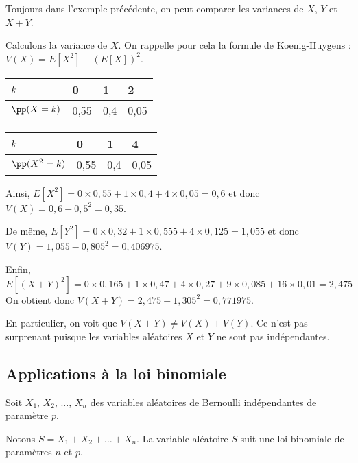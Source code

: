 \documentclass[11pt,fleqn, openany]{book} %
\begin{document}
\begin{example}Toujours dans l'exemple précédente, on peut comparer les variances de $X$, $Y$ et $X+Y$. 

Calculons la variance de $X$. On rappelle pour cela la formule de Koenig-Huygens : $V(X)=E[X^2]-(E[X])^2$.

\renewcommand{\arraystretch}{1.5}
\begin{minipage}{0.45\linewidth}
\begin{tabularx}{\linewidth}{|l|X|X|X|}
\hline
$k$ & 0 & 1 & 2  \\
\hline
$\pp(X=k)$ & 0,55 & 0,4 & 0,05  \\
\hline
\end{tabularx}
\end{minipage}\hfill\begin{minipage}{0.45\linewidth}
\begin{tabularx}{\linewidth}{|l|X|X|X|}
\hline
$k$ & 0 & 1 & 4  \\
\hline
$\pp(X^2=k)$ & 0,55 & 0,4 & 0,05  \\
\hline
\end{tabularx}
\end{minipage}

Ainsi, $E[X^2]=0 \times 0,55 + 1 \times 0,4 + 4 \times 0,05 = 0,6$ et donc $V(X)=0,6-0,5^2=0,35$.

De même, $E[Y^2]=0 \times 0,32 + 1 \times 0,555 + 4 \times 0,125 = 1,055$ et donc $V(Y)=1,055-0,805^2 = 0,406975$.

Enfin, $E[(X+Y)^2]=0\times 0,165 + 1 \times 0,47 + 4 \times 0,27 + 9 \times 0,085 + 16 \times 0,01 = 2,475$\\
On obtient donc $V(X+Y)=2,475-1,305^2=0,771975$.

En particulier, on voit que $V(X+Y)\neq V(X) + V(Y)$. Ce n'est pas surprenant puisque les variables aléatoires $X$ et $Y$ ne sont pas indépendantes.

\end{example}

\subsection{Applications à la loi binomiale}

\begin{proposition} Soit $X_1$, $X_2$, ..., $X_n$ des variables aléatoires de Bernoulli indépendantes de paramètre $p$. 

Notons $S=X_1+X_2+\ldots + X_n$. La variable aléatoire $S$ suit une loi binomiale de paramètres $n$ et $p$.\end{proposition}
\end{document}
